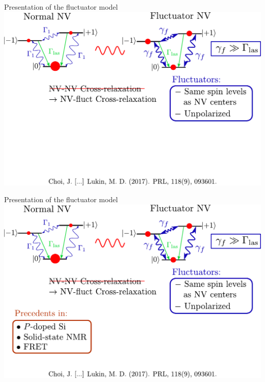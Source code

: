 \documentclass{beamer}
\begin{document}
\begin{frame}{Presentation of the fluctuator model}
\centering
\includegraphics[width=\textwidth,height=0.8\textheight,keepaspectratio]{Slide_fluct_intro_f-2}
\end{frame}

\begin{frame}{Presentation of the fluctuator model}
\centering
\includegraphics[width=\textwidth,height=0.8\textheight,keepaspectratio]{Slide_fluct_intro_f-1}
\end{frame}
\end{document}
